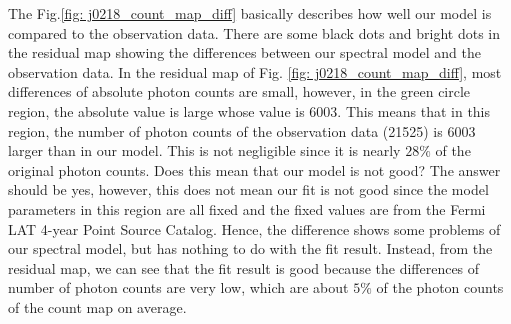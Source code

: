 \documentclass[12pt]{report}
\begin{document}
            The Fig.\ref{fig: j0218_count_map_diff} basically describes how well our model is compared to the 
            observation data. There are some black dots and bright dots in the residual map showing 
            the differences between our spectral model and the observation data. In the residual map of Fig.
            \ref{fig: j0218_count_map_diff}, most differences of absolute photon counts are small, however,
            in the green circle region, the absolute value is large whose value is 6003. This means that in this region,
            the number of photon counts of the observation data (21525) is 6003 larger than in our model.  
            This is not negligible since it is nearly $28\%$ of the original photon counts. 
            Does this mean that our model is not good? The answer should be yes, however, this does 
            not mean our fit is not good since the model parameters in this region are all fixed and the 
            fixed values are from the Fermi LAT 4-year Point Source Catalog. Hence, the difference 
            shows some problems of our spectral model, but has nothing to do with the fit result. 
            Instead, from the residual map, we can see that the fit result is good because the differences
            of number of photon counts are very low, which are about $5\%$ of the photon 
            counts of the count map on average.
\end{document}
